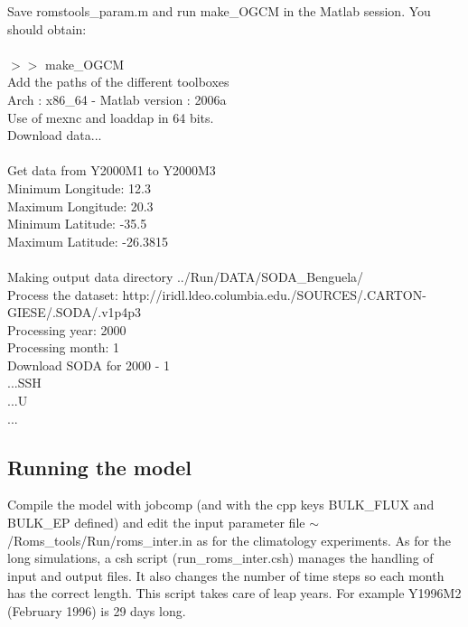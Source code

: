 Save romstools\_param.m and run make\_OGCM in the Matlab session.
You should obtain:
\\\\
$>>$ make\_OGCM\\
Add the paths of the different toolboxes\\
Arch : x86\_64 - Matlab version : 2006a\\
Use of mexnc and loaddap in 64 bits.\\
Download data...\\
\\
Get data from Y2000M1 to Y2000M3\\
Minimum Longitude: 12.3\\
Maximum Longitude: 20.3\\
Minimum Latitude: -35.5\\
Maximum Latitude: -26.3815\\
\\
Making output data directory ../Run/DATA/SODA\_Benguela/\\
Process the dataset: http://iridl.ldeo.columbia.edu./SOURCES/.CARTON-GIESE/.SODA/.v1p4p3\\
Processing year: 2000\\
  Processing month: 1\\
    Download SODA for 2000 - 1\\
    ...SSH\\
    ...U\\
...

\subsection{Running the model}

Compile the model with jobcomp (and with the 
cpp keys BULK\_FLUX and BULK\_EP defined) and edit 
the input parameter file 
$\sim$/Roms\_tools/Run/roms\_inter.in as for the
climatology experiments. As for the long simulations, a csh script
(run\_roms\_inter.csh) manages the handling of input and output files.
It also changes the number of time steps so each month has the correct
length. This script takes care of leap years. For example Y1996M2 
(February 1996) is 29 days long.

